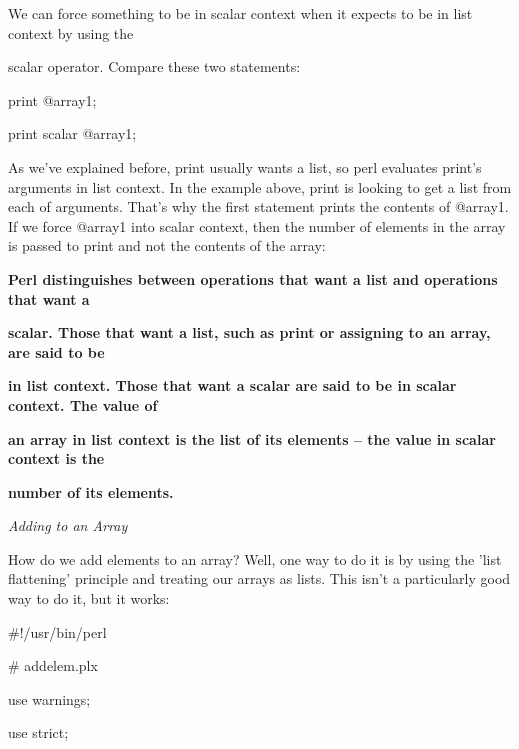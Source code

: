 \documentclass[a4paper,11pt]{book}
\begin{document}
\noindent 

\noindent We can force something to be in scalar context when it expects to be in list context by using the

\noindent scalar operator. Compare these two statements:

\noindent 

\noindent 

\noindent print @array1;

\noindent print scalar @array1;

\noindent 

\noindent As we've explained before, print usually wants a list, so perl evaluates print's arguments in list context. In the example above, print is looking to get a list from each of arguments. That's why the first statement prints the contents of @array1. If we force @array1 into scalar context, then the number of elements in the array is passed to print and not the contents of the array:

\noindent 

\noindent 

\noindent \textbf{Perl distinguishes between operations that want a list and operations that want a}

\noindent \textbf{scalar. Those that want a list, such as print or assigning to an array, are said to be}

\noindent \textbf{in list context. Those that want a scalar are said to be in scalar context. The value of}

\noindent \textbf{an array in list context is the list of its elements -- the value in scalar context is the}

\noindent \textbf{number of its elements.}

\noindent 

\noindent 

\noindent 

\noindent \textit{Adding to an Array}

\noindent How do we add elements to an array? Well, one way to do it is by using the 'list flattening' principle and treating our arrays as lists. This isn't a particularly good way to do it, but it works:

\noindent 

\noindent 

\noindent \#!/usr/bin/perl

\noindent \# addelem.plx

\noindent use warnings;

\noindent use strict;
\end{document}
